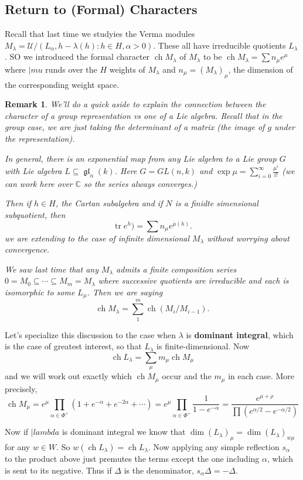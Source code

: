 \documentclass[12pt]{article}
\theoremstyle{nonumberbreak}
\theoremstyle{changebreak}
\theoremstyle{nonumberbreak}
\theoremstyle{change}
\newtheorem{rmk}[thm]{Remark}
\newcommand*{\C}{
\mathbb{C}
}
\DeclareMathOperator{\ch}{ch}
\DeclareMathOperator{\gl}{\mathfrak{gl}}
\DeclareMathOperator{\tr}{tr}
\begin{document}
\subsection{Return to (Formal) Characters}
Recall that last time we studyies the Verma modules $M_\lambda=\mathcal U/(L_\alpha, h-\lambda(h): h\in H, \alpha>0)$.
These all have irreducible quotients $L_\lambda$. SO we introduced the formal character $\ch M_\lambda$ of $M_\lambda$
to be $\ch M_\lambda=\sum n_\mu e^\mu$ where $|mu$ runds over the $H$ weights of $M_\lambda$ 
and $n_\mu=(M_\lambda)_\mu$, the dimension of the corresponding weight space. 

\begin{rmk}
	We'll do a quick aside to explain the connection between the character of a group representation vs 
	one of a Lie algebra. Recall that in the group case, we are just taking the determinant of a matrix 
	(the image of $g$ under the representation).

	In general, there is an exponential map from any Lie algebra to a Lie group $G$ with Lie algebra $L\subseteq \gl_n(k)$.
	Here $G=GL(n,k)$ and $\exp \mu=\sum_{i=0}^\infty \frac{\mu^i}{i!}$ (we can work here over $\C$ so the series 
	always converges.)

	Then if $h\in H$, the Cartan subalgebra and if $N$ is a finidte simensional subquotient, then
	\[\tr e^h)=\sum n_\mu e^{\mu(h)}.\]
	we are extending to the case of infinite dimensional $M_\lambda$ without worrying about convergence.

	We saw last time that any $M_\lambda$ admits a finite composition series $0=M_0\subseteq\cdots\subseteq M_m=M_\lambda$
	where successive quotients are irreducible and each is isomorphic to some $L_\mu$. Then we are saying
	\[\ch M_\lambda=\sum_{1}^m\ch(M_i/M_{i-1}).\]
\end{rmk}

Let's specialize this discussion to the case when $\lambda$ is \textbf{dominant integral}, which is the case of 
greatest interest, so that $L_\lambda$ is finite-dimensional. Now
\[\ch L_\lambda=\sum_\mu m_\mu\ch M_\mu\]
and we will work out exactly which $\ch M_\mu$ occur and the $m_\mu$ in each case. More precisely,
\[\ch M_\mu=e^\mu\prod_{\alpha\in\Phi^+}(1+e^{-\alpha}+e^{-2\alpha}+\cdots)=e^\mu\prod_{\alpha\in\Phi^+}\frac{1}{1-e^{-\alpha}}=\frac{e^{\mu+\rho}}{\prod(e^{\alpha/2}-e^{-\alpha/2})}\]

Now if $|lambda$ is dominant integral we know that $\dim(L_\lambda)_\mu=\dim(L_\lambda)_{w\mu}$
for any $w\in W$. So $w(\ch L_\lambda)=\ch L_\lambda$. Now applying any simple reflection $s_\alpha$ to the product above
just premutes the terms except the one including $\alpha$, which is sent to its negative. Thus if $\Delta$ is 
the denominator, $s_\alpha\Delta=-\Delta.$
\end{document}
